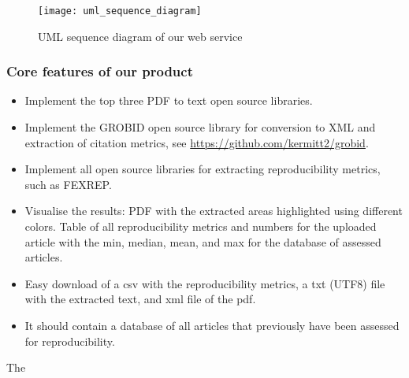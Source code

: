 \documentclass[
10pt, %
a4paper, %
oneside, %
headinclude,footinclude, %
BCOR5mm, %
]{scrartcl}
\begin{document}
\begin{figure}[!hbt]
\centering
\texttt{[image: uml\_sequence\_diagram]}
\caption{UML sequence diagram of our web service}
\label{fig:uml_sequence_diagram}
\end{figure}








\subsubsection{Core features of our product}

\begin{itemize}
	 \item Implement the top three PDF to text open source libraries.
	\item Implement the GROBID open source library for conversion to XML and extraction of citation metrics, see \url{https://github.com/kermitt2/grobid}.
	\item Implement all open source libraries for extracting reproducibility metrics, such as FEXREP.
	\item Visualise the results: \subitem PDF with the extracted areas highlighted using different colors. \subitem Table of all reproducibility metrics and numbers for the uploaded article with the min, median, mean, and max for the database of assessed articles.
	\item Easy download of a csv with the reproducibility metrics, a txt (UTF8) file with the extracted text, and xml file of the pdf.
	\item It should contain a database of all articles that previously have been assessed for reproducibility.
\end{itemize}

The 
\end{document}
